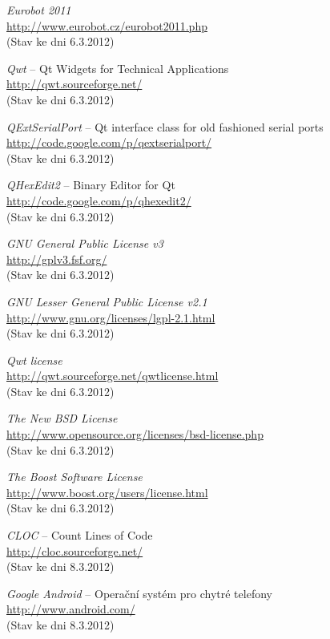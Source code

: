 \documentclass[12pt, a4paper, oneside]{article}
\newcommand{\It}{\textit}  %
\begin{document}
\begin{thebibliography}{99}
     \It{Eurobot 2011} \\
    \url{http://www.eurobot.cz/eurobot2011.php}\\
    (Stav ke dni 6.3.2012)

     \It{Qwt} -- Qt Widgets for Technical Applications \\
    \url{http://qwt.sourceforge.net/}\\
    (Stav ke dni 6.3.2012)

     \It{QExtSerialPort} -- Qt interface class for old fashioned serial ports \\
    \url{http://code.google.com/p/qextserialport/}\\
    (Stav ke dni 6.3.2012)

     \It{QHexEdit2} -- Binary Editor for Qt \\
    \url{http://code.google.com/p/qhexedit2/}\\
    (Stav ke dni 6.3.2012)

     \It{GNU General Public License v3} \\
    \url{http://gplv3.fsf.org/}\\
    (Stav ke dni 6.3.2012)

     \It{GNU Lesser General Public License v2.1} \\
    \url{http://www.gnu.org/licenses/lgpl-2.1.html}\\
    (Stav ke dni 6.3.2012)

     \It{Qwt license} \\
    \url{http://qwt.sourceforge.net/qwtlicense.html}\\
    (Stav ke dni 6.3.2012)

     \It{The New BSD License} \\
    \url{http://www.opensource.org/licenses/bsd-license.php}\\
    (Stav ke dni 6.3.2012)

     \It{The Boost Software License} \\
    \url{http://www.boost.org/users/license.html}\\
    (Stav ke dni 6.3.2012)

     \It{CLOC} -- Count Lines of Code \\
    \url{http://cloc.sourceforge.net/}\\
    (Stav ke dni 8.3.2012)

     \It{Google Android} -- Operační systém pro chytré telefony\\
    \url{http://www.android.com/}\\
    (Stav ke dni 8.3.2012)

\end{thebibliography}

\newpage
\listoffigures   %
\end{document}
